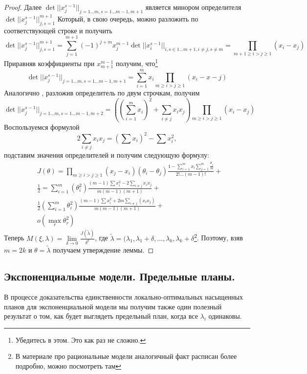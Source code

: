 \begin{proof}
Далее 
$\det ||x_j^{s-1}||_{j=1…m,s=1…m-1,m+1}$
является минором определителя 
$\det ||x_j^{s-1}||_{j,s = 1}^{m+1}$
Который, в свою очередь, можно разложить по соответствующей строке и получить
$$\det ||x_j^{s-1}||_{j,s = 1}^{m+1} = \sum\limits_{j=1}^{m+1} (-1)^{j+m} x_j^{m-1} \det ||x_i^{s-1}||_{i, s \in 1…m+1, i \neq j, s \neq m} = \prod\limits_{m+1 \geq i > j \geq 1}\left(x_i - x_j\right)$$
Приравняв коэффициенты при $x_{m+1}^{m-1}$ получим, что\footnote{Убедитесь в этом. Это как раз не сложно.}
$$\det ||x_j^{s-1}||_{j=1…m,s=1…m-1,m+1} = \sum\limits_{i=1}^{m}x_i \prod \limits_{m \geq i > j \geq 1}(x_i - x-j)$$
Аналогично , разложив определитель по двум строчкам, получим
$$\det ||x_j^{s-1}||_{j=1…m, s=1…m-1, m+2} = \left(\left(\sum\limits_{i=1}^m x_i\right)^2 + \sum\limits_{i\neq j}x_ix_j\right) \prod \limits_{m \geq i > j \geq 1}(x_i - x_j)$$
Воспользуемся формулой
$$2\sum\limits_{i\neq j} x_i x_j = \left(\sum x_i \right)^2 - \sum x_i^2, $$
подставим значения определителей и получим следующую формулу:
\begin{equation}
\label{determinantDecomposition}
\begin{split}
&J(\theta) = \prod \limits_{m \geq i >  j \geq 1}(x_j - x_i)(\theta_i - \theta_j) \frac{1-\sum\limits_{i=1}^{m}x_i\sum\limits_{j=1}^m\frac{\theta_j}{m}}{2!…(m-1)!} + \\
&\frac{1}{2} = \sum\limits_{i=1}^{m}(\theta_i^2)\frac{(m-1)\sum x_i^2 - 2\sum\limits_{i\neq j} x_i x_j}{m(m-1)(m+1)} + \\
& \frac{1}{2} (\sum \limits_{i=1}^{m}\theta_i^2) \frac{(m-1) \sum x_i^2 + 2m \sum\limits_{i \neq j} (x_i x_j)}{m(m-1)(m+1)}+ \\
& o(\max_{r} \theta_r^2)
\end{split}
\end{equation}
Теперь $M(\xi, \lambda) = \lim\limits_{\delta \rightarrow 0}\frac{J(\tilde{\lambda})}{\delta^k}$, где 
$\tilde{\lambda} = (\lambda_1, \lambda_1 + \delta, … , \lambda_k, \lambda_k + \delta$\footnote{В материале про рациональные модели аналогичный факт расписан более подробно, можно посмотреть там}.
Поэтому, взяв $m = 2k$ и $\theta = \tilde{\lambda}$ получаем утверждение леммы.
\end{proof}

\subsection{Экспоненциальные модели. Предельные планы.}
В процессе доказательства единственности локально-оптимальных насыщенных планов для экспоненциальной модели мы получим также один полезный результат о том, как будет выглядеть предельный план, когда все $\lambda_i$ одинаковы.

